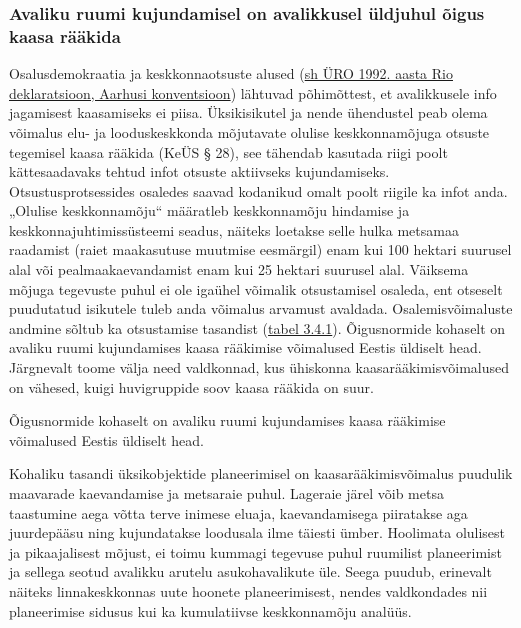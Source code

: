 \documentclass[estonian,]{article}
\begin{document}
\hypertarget{avaliku-ruumi-kujundamisel-on-avalikkusel-uxfcldjuhul-uxf5igus-kaasa-ruxe4uxe4kida}{%
\subsubsection*{Avaliku ruumi kujundamisel on avalikkusel üldjuhul õigus kaasa rääkida}\label{avaliku-ruumi-kujundamisel-on-avalikkusel-uxfcldjuhul-uxf5igus-kaasa-ruxe4uxe4kida}}

Osalusdemokraatia ja keskkonnaotsuste alused (\protect\hyperlink{uxdcRO1992}{sh ÜRO 1992. aasta Rio deklaratsioon, Aarhusi konventsioon}) lähtuvad põhimõttest, et avalikkusele info jagamisest kaasamiseks ei piisa. Üksikisikutel ja nende ühendustel peab olema võimalus elu- ja looduskeskkonda mõjutavate olulise keskkonnamõjuga otsuste tegemisel kaasa rääkida (KeÜS § 28), see tähendab kasutada riigi poolt kättesaadavaks tehtud infot otsuste aktiivseks kujundamiseks. Otsustusprotsessides osaledes saavad kodanikud omalt poolt riigile ka infot anda. „Olulise keskkonnamõju`` määratleb keskkonnamõju hindamise ja keskkonnajuhtimissüsteemi seadus, näiteks loetakse selle hulka metsamaa raadamist (raiet maakasutuse muutmise eesmärgil) enam kui 100 hektari suurusel alal või pealmaakaevandamist enam kui 25 hektari suurusel alal. Väiksema mõjuga tegevuste puhul ei ole igaühel võimalik otsustamisel osaleda, ent otseselt puudutatud isikutele tuleb anda võimalus arvamust avaldada.
Osalemisvõimaluste andmine sõltub ka otsustamise tasandist (\protect\hyperlink{table341}{tabel 3.4.1}). Õigusnormide kohaselt on avaliku ruumi kujundamises kaasa rääkimise võimalused Eestis üldiselt head. Järgnevalt toome välja need valdkonnad, kus ühiskonna kaasarääkimisvõimalused on vähesed, kuigi huvigruppide soov kaasa rääkida on suur.

\begin{blockquote-right}
Õigusnormide kohaselt on avaliku ruumi kujundamises kaasa rääkimise
võimalused Eestis üldiselt head.
\end{blockquote-right}

Kohaliku tasandi üksikobjektide planeerimisel on kaasarääkimisvõimalus puudulik maavarade kaevandamise ja metsaraie puhul. Lageraie järel võib metsa taastumine aega võtta terve inimese eluaja, kaevandamisega piiratakse aga juurdepääsu ning kujundatakse loodusala ilme täiesti ümber. Hoolimata olulisest ja pikaajalisest mõjust, ei toimu kummagi tegevuse puhul ruumilist planeerimist ja sellega seotud avalikku arutelu asukohavalikute üle. Seega puudub, erinevalt näiteks linnakeskkonnas uute hoonete planeerimisest, nendes valdkondades nii planeerimise sidusus kui ka kumulatiivse keskkonnamõju analüüs.
\end{document}
